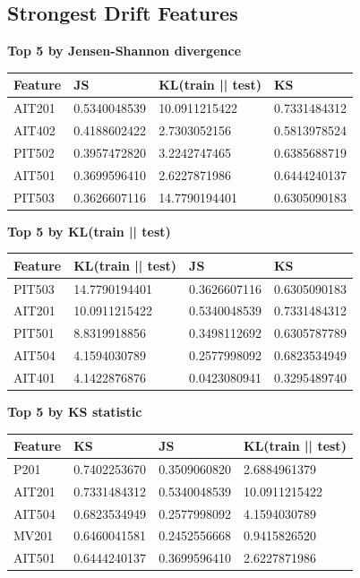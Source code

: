 \documentclass[11pt]{article}
\begin{document}
\subsection*{Strongest Drift Features}
\textbf{Top 5 by Jensen-Shannon divergence}

\begin{longtable}{@{}llll@{}}
\toprule
Feature & JS & KL(train || test) & KS \\
\midrule
AIT201 & 0.5340048539 & 10.0911215422 & 0.7331484312 \\
AIT402 & 0.4188602422 & 2.7303052156 & 0.5813978524 \\
PIT502 & 0.3957472820 & 3.2242747465 & 0.6385688719 \\
AIT501 & 0.3699596410 & 2.6227871986 & 0.6444240137 \\
PIT503 & 0.3626607116 & 14.7790194401 & 0.6305090183 \\
\bottomrule
\end{longtable}

\textbf{Top 5 by KL(train || test)}

\begin{longtable}{@{}llll@{}}
\toprule
Feature & KL(train || test) & JS & KS \\
\midrule
PIT503 & 14.7790194401 & 0.3626607116 & 0.6305090183 \\
AIT201 & 10.0911215422 & 0.5340048539 & 0.7331484312 \\
PIT501 & 8.8319918856 & 0.3498112692 & 0.6305787789 \\
AIT504 & 4.1594030789 & 0.2577998092 & 0.6823534949 \\
AIT401 & 4.1422876876 & 0.0423080941 & 0.3295489740 \\
\bottomrule
\end{longtable}

\textbf{Top 5 by KS statistic}

\begin{longtable}{@{}llll@{}}
\toprule
Feature & KS & JS & KL(train || test) \\
\midrule
P201 & 0.7402253670 & 0.3509060820 & 2.6884961379 \\
AIT201 & 0.7331484312 & 0.5340048539 & 10.0911215422 \\
AIT504 & 0.6823534949 & 0.2577998092 & 4.1594030789 \\
MV201 & 0.6460041581 & 0.2452556668 & 0.9415826520 \\
AIT501 & 0.6444240137 & 0.3699596410 & 2.6227871986 \\
\bottomrule
\end{longtable}
\end{document}
